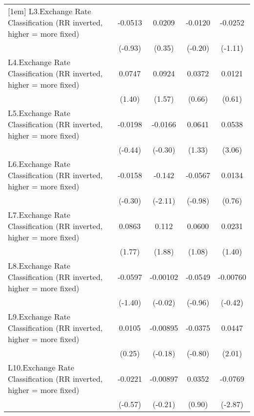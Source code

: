 {\begin{longtable}{l*{4}{c}}
[1em]
L3.Exchange Rate Classification (RR inverted, higher = more fixed)&  -0.0513         &   0.0209         &  -0.0120         &  -0.0252         \\
                &  (-0.93)         &   (0.35)         &  (-0.20)         &  (-1.11)         \\
[1em]
L4.Exchange Rate Classification (RR inverted, higher = more fixed)&   0.0747         &   0.0924         &   0.0372         &   0.0121         \\
                &   (1.40)         &   (1.57)         &   (0.66)         &   (0.61)         \\
[1em]
L5.Exchange Rate Classification (RR inverted, higher = more fixed)&  -0.0198         &  -0.0166         &   0.0641         &   0.0538\sym{**} \\
                &  (-0.44)         &  (-0.30)         &   (1.33)         &   (3.06)         \\
[1em]
L6.Exchange Rate Classification (RR inverted, higher = more fixed)&  -0.0158         &   -0.142\sym{*}  &  -0.0567         &   0.0134         \\
                &  (-0.30)         &  (-2.11)         &  (-0.98)         &   (0.76)         \\
[1em]
L7.Exchange Rate Classification (RR inverted, higher = more fixed)&   0.0863         &    0.112         &   0.0600         &   0.0231         \\
                &   (1.77)         &   (1.88)         &   (1.08)         &   (1.40)         \\
[1em]
L8.Exchange Rate Classification (RR inverted, higher = more fixed)&  -0.0597         & -0.00102         &  -0.0549         & -0.00760         \\
                &  (-1.40)         &  (-0.02)         &  (-0.96)         &  (-0.42)         \\
[1em]
L9.Exchange Rate Classification (RR inverted, higher = more fixed)&   0.0105         & -0.00895         &  -0.0375         &   0.0447\sym{*}  \\
                &   (0.25)         &  (-0.18)         &  (-0.80)         &   (2.01)         \\
[1em]
L10.Exchange Rate Classification (RR inverted, higher = more fixed)&  -0.0221         & -0.00897         &   0.0352         &  -0.0769\sym{**} \\
                &  (-0.57)         &  (-0.21)         &   (0.90)         &  (-2.87)         \\

\end{longtable}}
